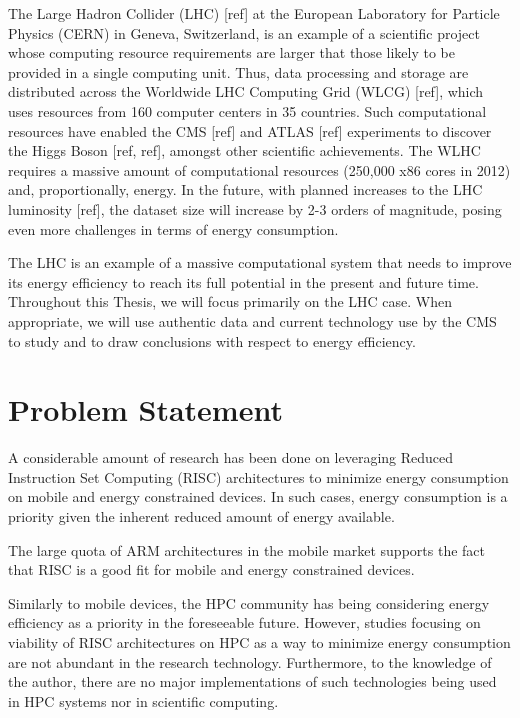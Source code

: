 The Large Hadron Collider (LHC) [ref] at the European Laboratory for Particle
Physics (CERN) in Geneva, Switzerland, is an example of a scientific project
whose computing resource requirements are larger that those likely to be provided 
in a single computing unit. Thus, data processing and storage are distributed across 
the Worldwide LHC
Computing Grid (WLCG) [ref], which uses resources from 160 computer centers in 35
countries. Such computational resources have enabled the CMS [ref] and ATLAS [ref]
experiments to discover the Higgs Boson [ref, ref], amongst other scientific 
achievements. 
The WLHC requires a massive amount of computational resources 
(250,000 x86 cores in 2012) and,
proportionally, energy. In the future, with planned increases to the LHC
luminosity [ref], the dataset size will increase by 2-3 orders of magnitude,
posing even more challenges in terms of energy consumption.

The LHC is an example of a massive computational system that needs to improve its
energy efficiency to reach its full potential in the present and future time.
Throughout this Thesis, we will focus primarily on the LHC case. When
appropriate, we will use authentic data and current technology use by the CMS to
study and to draw conclusions with respect to energy efficiency.  


\section{Problem Statement}
A considerable amount of research has been done on leveraging Reduced
Instruction Set Computing (RISC) architectures to minimize energy consumption on 
mobile and energy constrained devices. In such cases, energy consumption is a
priority given the inherent reduced amount of energy available. 

The large quota of ARM architectures in the mobile market supports the fact that
RISC is a good fit for mobile and energy constrained devices.


Similarly to mobile devices, the HPC community has being considering energy
efficiency as a priority in the foreseeable future. However, studies focusing on viability 
of RISC architectures on HPC as a way to minimize energy consumption are not
abundant in the research technology. Furthermore, to the knowledge of the
author, there are no major implementations of such technologies being used in
HPC systems nor in scientific computing.


